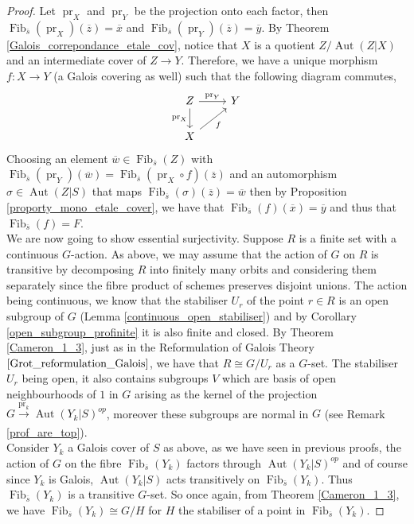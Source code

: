 \documentclass{article}
\theoremstyle{plain}
\theoremstyle{definition}
\DeclareMathOperator{\Fib}{Fib}
\DeclareMathOperator{\Aut}{Aut}
\DeclareMathOperator{\pr}{pr}
\begin{document}
\begin{proof}
    Let $\pr_X$ and $\pr_Y$ be the projection onto each factor, then $\Fib_{\overline{s}}(\pr_X)(\overline{z}) = \overline{x}$ and $\Fib_{\overline{s}}(\pr_Y)(\overline{z})=\overline{y}$.
    By Theorem \ref{Galois_correpondance_etale_cov}, notice that $X$ is a quotient $Z/\Aut(Z|X)$ and an intermediate cover of $Z\rightarrow Y$. 
    Therefore, we have a unique morphism $f:X\rightarrow Y$ (a Galois covering as well) such that the following diagram commutes,
    \[
    \begin{tikzcd}
        Z  \arrow[d, "\pr_X"'] \arrow[r,"\pr_Y"] & Y \\
        X \arrow[ur,"f"'] 
    \end{tikzcd}
    \]
Choosing an element $\overline{w}\in\Fib_{\overline{s}}(Z)$ with $\Fib_{\overline{s}}(\pr_Y)(\overline{w}) =\Fib_{\overline{s}}(\pr_X\circ f)(\overline{z})$ and an automorphism $\sigma\in\Aut(Z|S)$ that maps $\Fib_{\overline{s}}(\sigma)(\overline{z}) = \overline{w}$ then by Proposition \ref{proporty_mono_etale_cover}, we have that $\Fib_{\overline{s}}(f)(\overline{x}) = \overline{y}$ and thus that $\Fib_{\overline{s}}(f) = F$.\\
We are now going to show essential surjectivity.
Suppose $R$ is a finite set with a continuous $G$-action.
As above, we may assume that the action of $G$ on $R$ is transitive by decomposing $R$ into finitely many orbits and considering them separately since the fibre product of schemes preserves disjoint unions.
The action being continuous, we know that the stabiliser $U_r$ of the point $r\in R$ is an open subgroup of $G$ (Lemma \ref{continuous_open_stabiliser}) and by Corollary \ref{open_subgroup_profinite} it is also finite and closed. 
By Theorem \ref{Cameron_1_3}, just as in the Reformulation of Galois Theory $\ref{Grot_reformulation_Galois}$, we have that $R \cong G / U_r$ as a $G$-set.
The stabiliser $U_r$ being open, it also contains subgroups $V$ which are basis of open neighbourhoods of $1$ in $G$ arising as the kernel of the projection $G \xrightarrow[]{\pr_k}\Aut(Y_k|S)^{op}$, moreover these subgroups are normal in $G$ (see Remark \ref{prof_are_top}).\\
Consider $Y_k$ a Galois cover of $S$ as above, as we have seen in previous proofs, the action of $G$ on the fibre $\Fib_{\overline{s}}(Y_k)$ factors through $\Aut(Y_k|S)^{op}$ and of course since $Y_k$ is Galois, $\Aut(Y_k|S)$ acts transitively on $\Fib_{\overline{s}}(Y_k)$. 
Thus $\Fib_{\overline{s}}(Y_k)$ is a transitive $G$-set.
So once again, from Theorem \ref{Cameron_1_3}, we have $\Fib_{\overline{s}}(Y_k) \cong G/H$ for $H$ the stabiliser of a point in $\Fib_{\overline{s}}(Y_k)$.

\end{proof}
\end{document}
